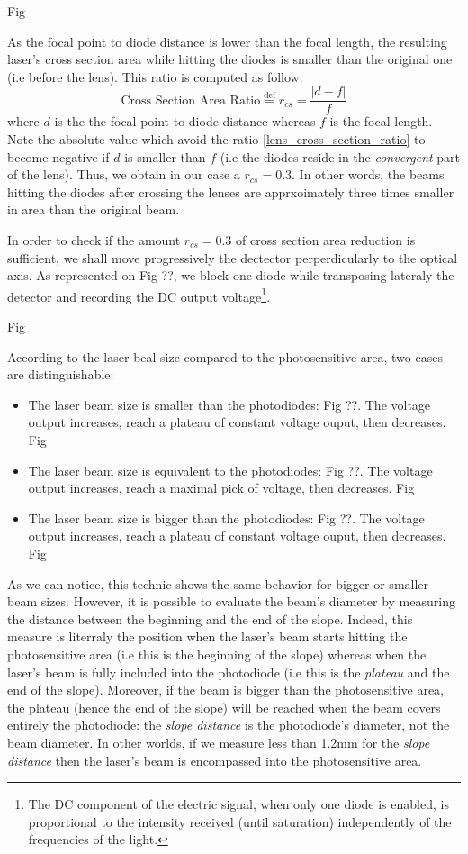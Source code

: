 \documentclass[12pt]{report}
\begin{document}
Fig

As the focal point to diode distance is lower than the focal length, the resulting laser's cross section area while hitting the diodes is smaller than the original one (i.e before the lens). This ratio is computed as follow:
\begin{equation}
\label{lens_cross_section_ratio}
\textrm{Cross Section Area Ratio} \stackrel{\text{def}}{=} r_{cs} = \frac{\vert d-f \vert}{f}
\end{equation}
where $d$ is the the focal point to diode distance whereas $f$ is the focal length. Note the absolute value which avoid the ratio \eqref{lens_cross_section_ratio} to become negative if $d$ is smaller than $f$ (i.e the diodes reside in the \textit{convergent} part of the lens). Thus, we obtain in our case a $r_{cs} = 0.3$. In other words, the beams hitting the diodes after crossing the lenses are apprxoimately three times smaller in area than the original beam.

In order to check if the amount $r_{cs} = 0.3$ of cross section area reduction is sufficient, we shall move progressively the dectector perperdicularly to the optical axis. As represented on Fig ??, we block one diode while transposing lateraly the detector and recording the DC output voltage\footnote{The DC component of the electric signal, when only one diode is enabled, is proportional to the intensity received (until saturation) independently of the frequencies of the light. }. 

Fig 

According to the laser beal size compared to the photosensitive area, two cases are distinguishable:
\begin{itemize}
	\item The laser beam size is smaller than the photodiodes: Fig ??. The voltage output increases, reach a plateau of constant voltage ouput, then decreases.
	Fig
	\item The laser beam size is equivalent to the photodiodes: Fig ??. The voltage output increases, reach a maximal pick of voltage, then decreases.
	Fig 
	\item The laser beam size is bigger than the photodiodes: Fig ??. The voltage output increases, reach a plateau of constant voltage ouput, then decreases.
	Fig
\end{itemize}
As we can notice, this technic shows the same behavior for bigger or smaller beam sizes. However, it is possible to evaluate the beam's diameter by measuring the distance between the beginning and the end of the slope. Indeed, this measure is literraly the position when the laser's beam starts hitting the photosensitive area (i.e this is the beginning of the slope) whereas when the laser's beam is fully included into the photodiode (i.e this is the \textit{plateau} and the end of the slope). Moreover, if the beam is bigger than the photosensitive area, the plateau (hence the end of the slope) will be reached when the beam covers entirely the photodiode: the \textit{slope distance} is the photodiode's diameter, not the beam diameter. In other worlds, if we measure less than 1.2mm for the \textit{slope distance} then the laser's beam is encompassed into the photosensitive area.
\end{document}
